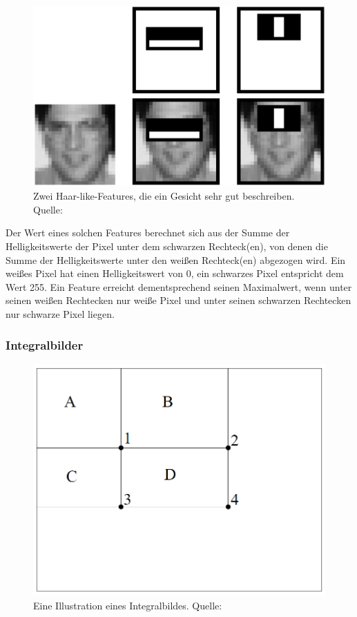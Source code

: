 \documentclass[doktyp=semarbeit, sprache=german]{TUBAFarbeiten}
\begin{document}
\begin{figure}
	\centering
	\includegraphics[width=0.7\linewidth]{images/haarfeatures2}
	\caption[Haar-like-Features - Beispiel]{Zwei Haar-like-Features, die ein Gesicht sehr gut beschreiben. Quelle: \cite{Viola01rapidobject}}
	\label{fig:haarfeatures2}
\end{figure}

Der Wert eines solchen Features berechnet sich aus der Summe der Helligkeitswerte der Pixel unter dem schwarzen Rechteck(en), von denen die Summe der Helligkeitswerte unter den weißen Rechteck(en) abgezogen wird. Ein weißes Pixel hat einen Helligkeitswert von 0, ein schwarzes Pixel entspricht dem Wert 255. Ein Feature erreicht dementsprechend seinen Maximalwert, wenn unter seinen weißen Rechtecken nur weiße Pixel und unter seinen schwarzen Rechtecken nur schwarze Pixel liegen.

\subsubsection{Integralbilder}

\begin{figure}
	\centering
	\includegraphics[width=0.7\linewidth]{images/integral}
	\caption[Integralbild]{Eine Illustration eines Integralbildes. Quelle: \cite{Viola01rapidobject}}
	\label{fig:integral}
\end{figure}
\end{document}
